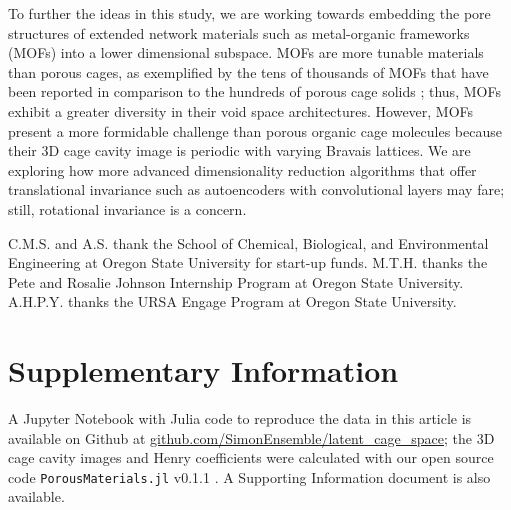 \documentclass[journal=jacsat,manuscript=article,layout=traditional]{achemso}
\begin{document}
To further the ideas in this study, we are working towards embedding the pore structures of extended network materials such as metal-organic frameworks (MOFs) into a lower dimensional subspace. MOFs are more tunable materials than porous cages, as exemplified by the tens of thousands of MOFs that have been reported \cite{moghadam2017development} in comparison to the hundreds of porous cage solids \cite{evans2016computational}; thus, MOFs exhibit a greater diversity in their void space architectures. However, MOFs present a more formidable challenge than porous organic cage molecules because their 3D cage cavity image is periodic with varying Bravais lattices. We are exploring how more advanced dimensionality reduction algorithms that offer translational invariance such as autoencoders \cite{hinton2006reducing} with convolutional layers \cite{kavukcuoglu2010learning,zeiler2010deconvolutional} may fare; still, rotational invariance is a concern.



\begin{acknowledgement}


C.M.S. and A.S. thank the School of Chemical, Biological, and Environmental Engineering at Oregon State University for start-up funds. M.T.H. thanks the Pete and Rosalie Johnson Internship Program at Oregon State University. A.H.P.Y. thanks the URSA Engage Program at Oregon State University.

\end{acknowledgement}



\section{Supplementary Information} A Jupyter Notebook with Julia \cite{julia} code to reproduce the data in this article is available on Github at \url{github.com/SimonEnsemble/latent_cage_space}; the 3D cage cavity images and Henry coefficients were calculated with our open source code \texttt{PorousMaterials.jl} v0.1.1 \cite{PorousMaterialsJL}. A Supporting Information document is also available.


\end{document}
